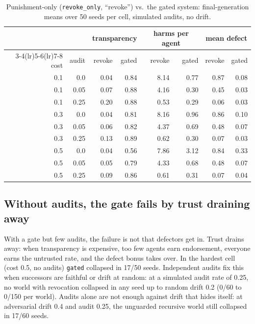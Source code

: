 \documentclass[11pt]{article}
\newcommand{\code}[1]{\texttt{#1}}
\begin{document}
\begin{table}[h]
\centering\small
\begin{tabular}{rrrrrrrr}
\toprule
 & & \multicolumn{2}{c}{transparency} & \multicolumn{2}{c}{harms per agent} & \multicolumn{2}{c}{mean defect} \\
\cmidrule(lr){3-4}\cmidrule(lr){5-6}\cmidrule(lr){7-8}
cost & audit & revoke & gated & revoke & gated & revoke & gated \\
\midrule
0.1 & 0.0 & 0.04 & 0.84 & 8.14 & 0.77 & 0.87 & 0.08 \\
0.1 & 0.05 & 0.07 & 0.88 & 4.16 & 0.30 & 0.45 & 0.03 \\
0.1 & 0.25 & 0.20 & 0.88 & 0.53 & 0.29 & 0.06 & 0.03 \\
0.3 & 0.0 & 0.04 & 0.81 & 8.16 & 0.96 & 0.86 & 0.10 \\
0.3 & 0.05 & 0.06 & 0.82 & 4.37 & 0.69 & 0.48 & 0.07 \\
0.3 & 0.25 & 0.13 & 0.89 & 0.62 & 0.30 & 0.07 & 0.03 \\
0.5 & 0.0 & 0.04 & 0.56 & 7.86 & 3.12 & 0.84 & 0.33 \\
0.5 & 0.05 & 0.05 & 0.79 & 4.33 & 0.68 & 0.48 & 0.07 \\
0.5 & 0.25 & 0.09 & 0.86 & 0.61 & 0.31 & 0.07 & 0.04 \\
\bottomrule
\end{tabular}
\caption{Punishment-only (\code{revoke\_only}, ``revoke'') vs.\ the gated system:
final-generation means over 50 seeds per cell, simulated audits, no drift.}
\label{tab:baseline}
\end{table}

\subsection{Without audits, the gate fails by trust draining away}

With a gate but few audits, the failure is not that defectors get in. Trust drains away: when
transparency is expensive, too few agents earn endorsement, everyone earns the untrusted rate,
and the defect bonus takes over. In the hardest cell (cost 0.5, no audits) \code{gated}
collapsed in 17/50 seeds. Independent audits fix this when successors are faithful or drift at
random: at a simulated audit rate of 0.25, no world with revocation collapsed in any seed up to
random drift 0.2 (0/60 to 0/150 per world). Audits alone are not enough against drift that
hides itself: at adversarial drift 0.4 and audit 0.25, the unguarded recursive world still
collapsed in 17/60 seeds.
\end{document}
